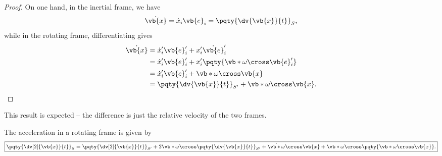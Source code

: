 \begin{proof}
    On one hand, in the inertial frame, we have
    \begin{equation}
        \dot{\vb{x}} = \dot{x}_i \vb{e}_i = \pqty{\dv{\vb{x}}{t}}_{S},
    \end{equation}
    while in the rotating frame, differentiating gives
    \begin{subequations}\begin{align}
        \dot{\vb{x}} &= \dot{x}_i' \vb{e}_i' + x_i' \dot{\vb{e}}_i' \\
        &= \dot{x}_i' \vb{e}_i' + x_i' \pqty{\vb*{\omega} \cross \vb{e}_i'} \\
        &= \dot{x}_i' \vb{e}_i' + \vb*{\omega} \cross \vb{x} \\
        &= \pqty{\dv{\vb{x}}{t}}_{S'} + \vb*{\omega} \cross \vb{x}.
    \end{align}\end{subequations}
\end{proof}

This result is expected -- the difference is just the relative velocity of the two frames.

\begin{proposition}
    \label{prop:acceleration-rotating-frame}%
    The acceleration in a rotating frame is given by
    \begin{equation}
        \boxed{\pqty{\dv[2]{\vb{x}}{t}}_{S} = \pqty{\dv[2]{\vb{x}}{t}}_{S'} + 2 \vb*{\omega} \cross \pqty{\dv{\vb{x}}{t}}_{S'} + \dot{\vb*{\omega}} \cross \vb{x} + \vb*{\omega} \cross \pqty{\vb*{\omega} \cross \vb{x}}.}
    \end{equation}
\end{proposition}

